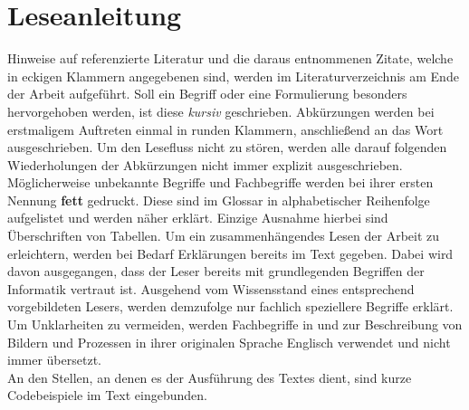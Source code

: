 \section*{Leseanleitung}
Hinweise auf referenzierte Literatur und die daraus entnommenen Zitate, welche in eckigen Klammern angegebenen sind, werden im Literaturverzeichnis am Ende der Arbeit aufgeführt. Soll ein Begriff oder eine Formulierung besonders hervorgehoben werden, ist diese \textit{kursiv} geschrieben.
Abkürzungen werden bei erstmaligem Auftreten einmal in runden Klammern, anschließend an das Wort ausgeschrieben. Um den Lesefluss nicht zu stören, werden alle darauf folgenden Wiederholungen der Abkürzungen nicht immer explizit ausgeschrieben.
\\
Möglicherweise unbekannte Begriffe und Fachbegriffe werden bei ihrer ersten
Nennung \textbf{fett} gedruckt. Diese sind im Glossar in alphabetischer Reihenfolge aufgelistet und werden näher erklärt. Einzige Ausnahme hierbei sind Überschriften von Tabellen. Um ein zusammenhängendes Lesen der Arbeit zu erleichtern, werden bei Bedarf Erklärungen bereits im Text gegeben. Dabei wird davon ausgegangen, dass der Leser bereits mit grundlegenden Begriffen der Informatik vertraut ist. Ausgehend vom Wissensstand eines entsprechend vorgebildeten Lesers, werden demzufolge nur fachlich speziellere Begriffe erklärt.
\\
Um Unklarheiten zu vermeiden, werden Fachbegriffe in und zur Beschreibung von Bildern und Prozessen in ihrer originalen Sprache Englisch verwendet und nicht immer übersetzt.
\\
An den Stellen, an denen es der Ausführung des Textes dient, sind kurze Codebeispiele im Text eingebunden. 